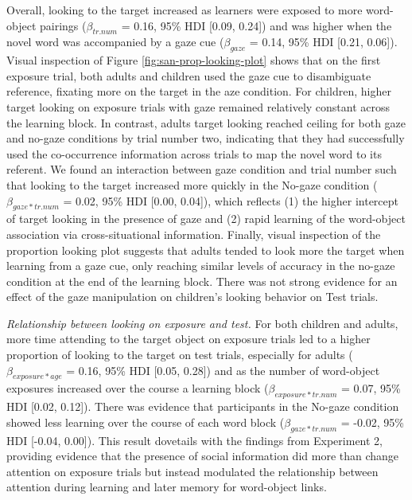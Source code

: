 \documentclass[10pt, letterpaper]{article}
\begin{document}
Overall, looking to the target increased as learners were exposed to
more word-object pairings (\(\beta_{tr.num}\) = 0.16, 95\% HDI {[}0.09,
0.24{]}) and was higher when the novel word was accompanied by a gaze
cue (\(\beta_{gaze}\) = 0.14, 95\% HDI {[}0.21, 0.06{]}). Visual
inspection of Figure \ref{fig:san-prop-looking-plot} shows that on the
first exposure trial, both adults and children used the gaze cue to
disambiguate reference, fixating more on the target in the aze
condition. For children, higher target looking on exposure trials with
gaze remained relatively constant across the learning block. In
contrast, adults target looking reached ceiling for both gaze and
no-gaze conditions by trial number two, indicating that they had
successfully used the co-occurrence information across trials to map the
novel word to its referent. We found an interaction between gaze
condition and trial number such that looking to the target increased
more quickly in the No-gaze condition (\(\beta_{gaze*tr.num}\) = 0.02,
95\% HDI {[}0.00, 0.04{]}), which reflects (1) the higher intercept of
target looking in the presence of gaze and (2) rapid learning of the
word-object association via cross-situational information. Finally,
visual inspection of the proportion looking plot suggests that adults
tended to look more the target when learning from a gaze cue, only
reaching similar levels of accuracy in the no-gaze condition at the end
of the learning block. There was not strong evidence for an effect of
the gaze manipulation on children's looking behavior on Test trials.

\emph{Relationship between looking on exposure and test.} For both
children and adults, more time attending to the target object on
exposure trials led to a higher proportion of looking to the target on
test trials, especially for adults (\(\beta_{exposure*age}\) = 0.16,
95\% HDI {[}0.05, 0.28{]}) and as the number of word-object exposures
increased over the course a learning block (\(\beta_{exposure*tr.num}\)
= 0.07, 95\% HDI {[}0.02, 0.12{]}). There was evidence that participants
in the No-gaze condition showed less learning over the course of each
word block (\(\beta_{gaze*tr.num}\) = -0.02, 95\% HDI {[}-0.04,
0.00{]}). This result dovetails with the findings from Experiment 2,
providing evidence that the presence of social information did more than
change attention on exposure trials but instead modulated the
relationship between attention during learning and later memory for
word-object links.
\end{document}
